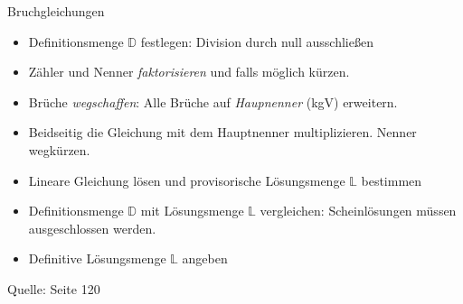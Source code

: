\begin{rezept}{Bruchgleichungen}{}
  \begin{itemize}
    \item Definitionsmenge $\mathbb{D}$ festlegen: Division durch null ausschließen
  \item Zähler und Nenner \textit{faktorisieren} und falls möglich kürzen.
  \item Brüche \textit{wegschaffen}: Alle Brüche auf
    \textit{Haupnenner} (kgV) erweitern.
  \item Beidseitig die Gleichung mit dem Hauptnenner
    multiplizieren. Nenner wegkürzen.
  \item Lineare Gleichung lösen und provisorische Lösungsmenge $\mathbb{L}$
    bestimmen
  \item Definitionsmenge $\mathbb{D}$ mit Lösungsmenge $\mathbb{L}$
    vergleichen: Scheinlösungen müssen ausgeschlossen werden.
  \item Definitive Lösungsmenge $\mathbb{L}$ angeben
    \end{itemize}
  Quelle: \cite{marthaler17} Seite 120
\end{rezept}

\newpage
